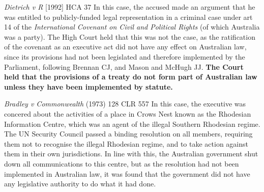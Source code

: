 \begin{casedetails}{\textit{Dietrich v R} [1992] HCA 37}\label{case: Dietrich v R}
    \flushleft
    In this case, the accused made an argument that he was entitled to publicly-funded legal representation in a criminal case under art 14 of the \textit{International Covenant on Civil and Political Rights} (of which Australia was a party). The High Court held that this was not the case, as the ratification of the covenant as an executive act did not have any effect on Australian law, since its provisions had not been legislated and therefore implemented by the Parliament, following Brennan CJ, and Mason and McHugh JJ. \textbf{The Court held that the provisions of a treaty do not form part of Australian law unless they have been implemented by statute.}
\end{casedetails}

\begin{casedetails}{\textit{Bradley v Commonwealth} (1973) 128 CLR 557}\label{case:Bradley v Commonwealth}
    \flushleft
    In this case, the executive was concered about the activities of a place in Crows Nest known as the Rhodesian Information Centre, which was an agent of the illegal Southern Rhodesian regime. The UN Security Council passed a binding resolution on all members, requiring them not to recognise the illegal Rhodesian regime, and to take action against them in their own jurisdictions. In line with this, the Australian government shut down all communications to this centre, but as the resolution had not been implemented in Australian law, it was found that the government did not have any legislative authority to do what it had done.
\end{casedetails}

